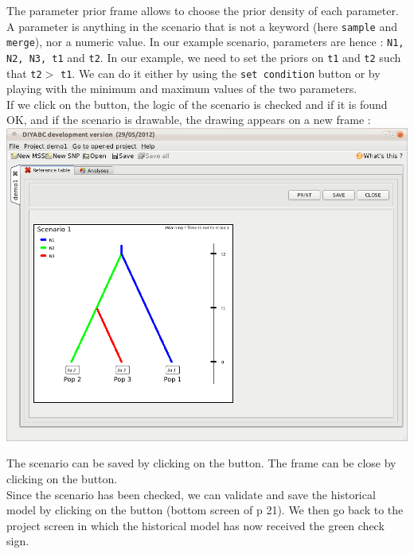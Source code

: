 The parameter prior frame allows to choose the prior density of each parameter. A parameter is anything in the scenario that is not a keyword (here \texttt{sample} and \texttt{merge}), nor a numeric value. In our example scenario, parameters are hence : \texttt{N1, N2, N3, t1} and \texttt{t2}. In our example, we need to set the priors on \texttt{t1} and \texttt{t2} such that \texttt{t2}$>$  \texttt{t1}. We can do it either by using the \texttt{set condition} button or by playing with the minimum and maximum values of the two parameters.\\

If we click on the  button, the logic of the scenario is checked and if it is found OK, and if the scenario is drawable, the drawing appears on a new frame : \\

\includegraphics[scale=0.35]{gui_pictures/Capture-DIYABC-13.png} 

The scenario can be saved by clicking on the  button. The frame can be close by clicking on the  button.\\

Since the scenario has been checked, we can validate and save the historical model by clicking on the   button (bottom screen of p 21). We then go back to the project screen in which the historical model has now received the green check sign.\\

